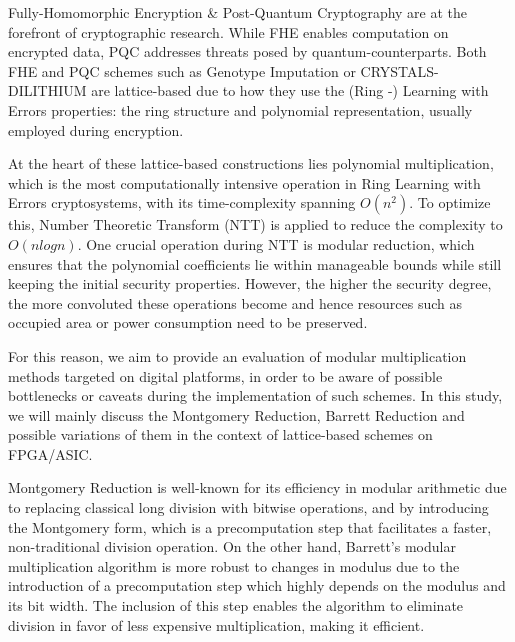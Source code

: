 \documentclass[11pt,
  titlepage=false,
  abstract=on,
]{scrreprt}
\begin{document}
Fully-Homomorphic Encryption \& Post-Quantum Cryptography are at the forefront of cryptographic research. While FHE enables computation on encrypted data, PQC
addresses threats posed by quantum-counterparts. Both FHE and PQC schemes such as Genotype Imputation \cite{gursoy2022privacy} or CRYSTALS-DILITHIUM \cite{2018crystals} are 
lattice-based due to how they use the (Ring -) Learning with Errors properties: the ring structure and polynomial representation, usually employed during encryption.

At the heart of these lattice-based constructions lies polynomial multiplication, which is the most computationally intensive operation in Ring Learning 
with Errors cryptosystems, with its time-complexity spanning $O(n^{2})$. To optimize this, Number Theoretic Transform (NTT) is applied to reduce the complexity to $O(nlogn)$.
One crucial operation during NTT is modular reduction, which ensures that the polynomial coefficients lie within manageable bounds while still keeping the initial 
security properties. However, the higher the security degree, the more convoluted these operations become and hence resources such as occupied area or power consumption 
need to be preserved.

For this reason, we aim to provide an evaluation of modular multiplication methods targeted on digital platforms, in order to be aware of possible bottlenecks 
or caveats during the implementation of such schemes. In this study, we will mainly discuss the Montgomery Reduction, Barrett Reduction and possible variations of them
in the context of lattice-based schemes on FPGA/ASIC.


Montgomery Reduction \cite{montgomery1985modular} is well-known for its efficiency in modular arithmetic due to replacing classical long division with bitwise operations, and by introducing the Montgomery form,
which is a precomputation step that facilitates a faster, non-traditional division operation.
On the other hand, Barrett's modular multiplication algorithm \cite{barrett1986implementing} is more robust to changes in modulus due to the introduction of a precomputation step which highly depends on the modulus and
its bit width. The inclusion of this step enables the algorithm to eliminate division in favor of less expensive multiplication, making it efficient.
\end{document}
